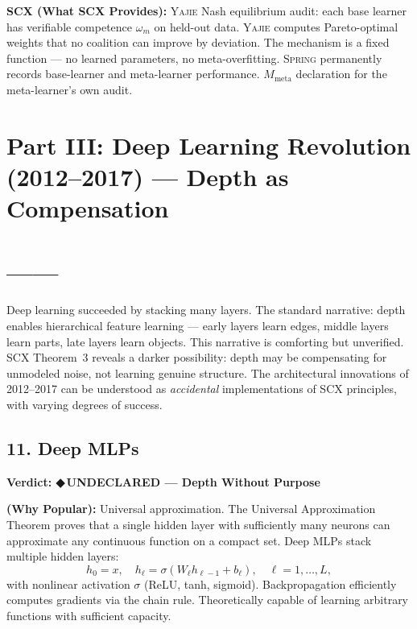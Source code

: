 \documentclass[12pt,a4paper]{article}
\theoremstyle{definition}
\newcommand{\guilty}{{\color{guiltycolor}\textbf{◆\,UNDECLARED}}}
\newcommand{\Yajie}{\textsc{Yajie}}
\newcommand{\Spring}{\textsc{Spring}}
\newcommand{\SCX}{\textsc{SCX}}
\newcommand{\auditHeader}[1]{\medskip\noindent\textbf{\large #1}\medskip}
\newcommand{\whyPopular}{\noindent\textbf{ (Why Popular):} }
\newcommand{\whatMissing}{\noindent\textbf{SCX (What SCX Provides):} }
\begin{document}
\whatMissing{} \Yajie{} Nash equilibrium audit: each base learner has verifiable competence $\omega_m$ on held-out data. \Yajie{} computes Pareto-optimal weights that no coalition can improve by deviation. The mechanism is a fixed function — no learned parameters, no meta-overfitting. \Spring{} permanently records base-learner and meta-learner performance. $M_{\text{meta}}$ declaration for the meta-learner's own audit.

\section{Part III: Deep Learning Revolution (2012--2017) — Depth as Compensation}
\section{——}
\label{sec:deep}

Deep learning succeeded by stacking many layers. The standard narrative: depth enables hierarchical feature learning — early layers learn edges, middle layers learn parts, late layers learn objects. This narrative is comforting but unverified. \SCX{} Theorem~3 reveals a darker possibility: depth may be compensating for unmodeled noise, not learning genuine structure. The architectural innovations of 2012--2017 can be understood as \textit{accidental} implementations of \SCX{} principles, with varying degrees of success.

\subsection{11. Deep MLPs }

\auditHeader{Verdict: \guilty{} — Depth Without Purpose}

\whyPopular{} Universal approximation. The Universal Approximation Theorem proves that a single hidden layer with sufficiently many neurons can approximate any continuous function on a compact set. Deep MLPs stack multiple hidden layers:
\[
h_0 = x, \quad h_\ell = \sigma(W_\ell h_{\ell-1} + b_\ell), \quad \ell = 1, \ldots, L,
\]
with nonlinear activation $\sigma$ (ReLU, tanh, sigmoid). Backpropagation efficiently computes gradients via the chain rule. Theoretically capable of learning arbitrary functions with sufficient capacity.
\end{document}

